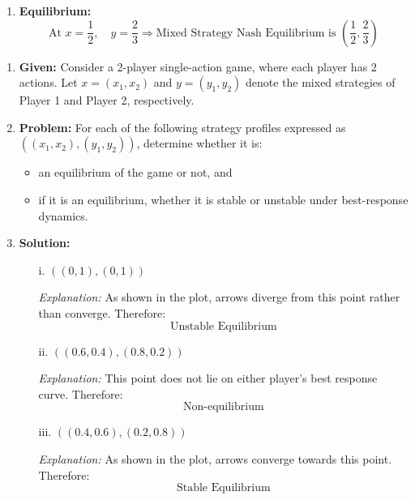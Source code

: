 \begin{example}
\begin{enumerate}
\begin{enumerate}
            \item \textbf{Equilibrium:}
            \[
            \text{At } x = \frac{1}{2}, \quad y = \frac{2}{3} \Rightarrow \text{Mixed Strategy Nash Equilibrium is } \left( \frac{1}{2}, \frac{2}{3} \right)
            \]
        \end{enumerate}
    
    \end{enumerate}
\end{example}
\newpage

\begin{example}
    \begin{enumerate}
        \item \textbf{Given:} Consider a 2-player single-action game, where each player has 2 actions. Let $x = (x_1, x_2)$ and $y = (y_1, y_2)$ denote the mixed strategies of Player 1 and Player 2, respectively.
    
    
        \item \textbf{Problem:} For each of the following strategy profiles expressed as $((x_1, x_2), (y_1, y_2))$, determine whether it is:
        \begin{itemize}
            \item an equilibrium of the game or not, and
            \item if it is an equilibrium, whether it is stable or unstable under best-response dynamics.
        \end{itemize}
    
        \item \textbf{Solution:}
        \begin{enumerate}
            \item[i.] $((0,1), (0,1))$
    
            \textit{Explanation:} As shown in the plot, arrows diverge from this point rather than converge. Therefore:
            \[
            \boxed{\text{Unstable Equilibrium}}
            \]
    
            \item[ii.] $((0.6, 0.4), (0.8, 0.2))$
    
            \textit{Explanation:}  
            This point does not lie on either player's best response curve. Therefore: 
            \[
            \boxed{\text{Non-equilibrium}}
            \]
    
            \item[iii.] $((0.4, 0.6), (0.2, 0.8))$
    
            \textit{Explanation:}  
            As shown in the plot, arrows converge towards this point. Therefore:
            \[
            \boxed{\text{Stable Equilibrium}}
            \]
        \end{enumerate}
    
    \end{enumerate}
\end{example}
\newpage

